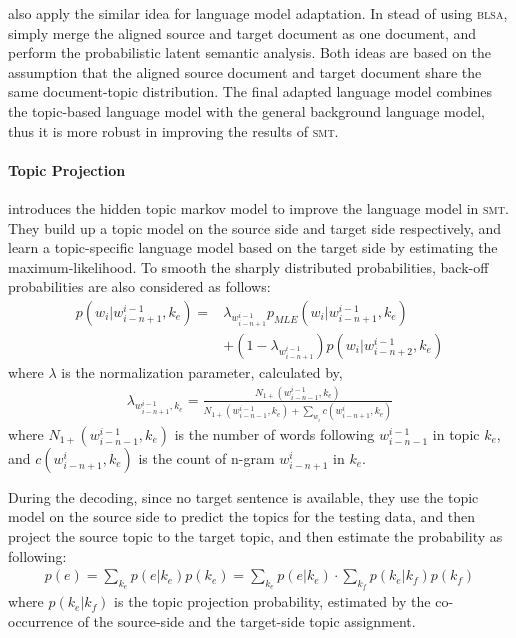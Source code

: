 \cite{Ruiz-2011} also apply the similar idea for language model adaptation. In stead of using \textsc{blsa}, \cite{Ruiz-2011} simply merge the aligned source and target document as one document, and perform the probabilistic latent semantic analysis. Both ideas are based on the assumption that the aligned source document and target document share the same document-topic distribution. The final adapted language model combines the topic-based language model with the general background language model, thus it is more robust in improving the results of \textsc{smt}. 


\paragraph{Topic Projection}

\citet{Yu-2013} introduces the hidden topic markov model to improve the language model in \textsc{smt}. They build up a topic model on the source side and target side respectively, and learn a topic-specific language model based on the target side by estimating the maximum-likelihood. To smooth the sharply distributed probabilities, back-off probabilities are also considered as follows:
\begin{align}
p(w_i | w^{i-1}_{i-n+1}, k_e) = &\lambda_{w^{i-1}_{i-n+1}} p_{MLE}(w_i|w^{i-1}_{i-n+1}, k_e) \\
&+ (1- \lambda_{w^{i-1}_{i-n+1}})p(w_i|w^{i-1}_{i-n+2}, k_e)
\end{align}
where $\lambda$ is the normalization parameter, calculated by,
\begin{align}
\lambda_{w^{i-1}_{i-n+1}, k_e} = \frac{N_{1+}(w^{i-1}_{i-n-1}, k_e)}{N_{1+}(w^{i-1}_{i-n-1}, k_e) + \sum_{w_i}c(w^i_{i-n+1}, k_e)}
\end{align}
where $N_{1+}(w^{i-1}_{i-n-1}, k_e)$ is the number of words following $w^{i-1}_{i-n-1}$ in topic $k_e$, and $c(w^i_{i-n+1}, k_e)$ is the count of n-gram $w^i_{i-n+1}$ in $k_e$.

During the decoding, since no target sentence is available, they use the topic model on the source side to predict the topics for the testing data, and then project the source topic to the target topic, and then estimate the probability as following:
\begin{align}
p(e) = \sum_{k_e} p(e|k_e) p(k_e) = \sum_{k_e} p(e|k_e) \cdot \sum_{k_f} p(k_e|k_f) p (k_f)
\end{align}
where $p(k_e|k_f)$ is the topic projection probability, estimated by the co-occurrence of the source-side and the target-side topic assignment.


